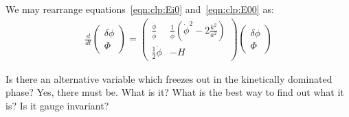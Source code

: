 We may rearrange equations~\eqref{eqn:clp:Ei0} and~\eqref{eqn:clp:E00} as:
\begin{align}
  \frac{d}{dt}
  \left(
  \begin{array}{c}
    \delta \phi \\
    \Phi
  \end{array}
  \right)
  =
  \left(
  \begin{array}{cc}
    \frac{\ddot{\phi}}{\dot{\phi}} & \frac{1}{\dot{\phi}}\left( \dot{\phi}^2 - 2\frac{k^2}{a^2} \right) \\
    \frac{1}{2}\dot{\phi} & -H 
  \end{array}
  \right)
  \left(
  \begin{array}{c}
    \delta \phi \\
    \Phi
  \end{array}
  \right)
\end{align}


Is there an alternative variable which freezes out in the kinetically dominated phase? Yes, there must be. What is it? What is the best way to find out what it is? Is it gauge invariant?

